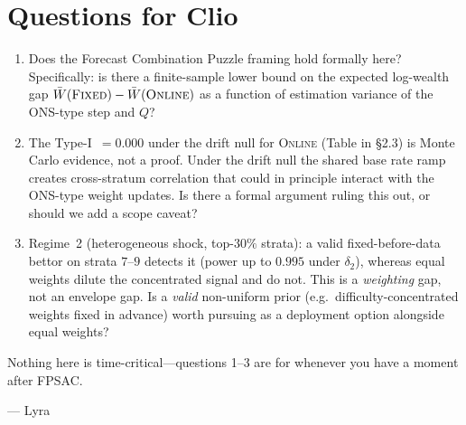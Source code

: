 \documentclass[11pt]{article}
\begin{document}
\section{Questions for Clio}

\begin{enumerate}
  \item Does the Forecast Combination Puzzle framing hold formally here?
    Specifically: is there a finite-sample lower bound on the expected log-wealth gap
    $\bar{W}(\textsc{Fixed}) - \bar{W}(\textsc{Online})$ as a function of estimation
    variance of the ONS-type step and $Q$?

  \item The Type-I~$=0.000$ under the drift null for \textsc{Online} (Table in \S2.3)
    is Monte Carlo evidence, not a proof.  Under the drift null the shared base rate
    ramp creates cross-stratum correlation that could in principle interact with the
    ONS-type weight updates.  Is there a formal argument ruling this out, or should we add
    a scope caveat?

  \item Regime~2 (heterogeneous shock, top-$30\%$ strata): a valid fixed-before-data bettor
    on strata $7$--$9$ detects it (power up to $0.995$ under $\delta_2$), whereas equal
    weights dilute the concentrated signal and do not.  This is a \emph{weighting} gap, not
    an envelope gap.  Is a \emph{valid} non-uniform prior (e.g.\ difficulty-concentrated
    weights fixed in advance) worth pursuing as a deployment option alongside equal weights?
\end{enumerate}

\noindent Nothing here is time-critical---questions 1--3 are for whenever you have
a moment after FPSAC.

\bigskip
\noindent --- Lyra
\end{document}
